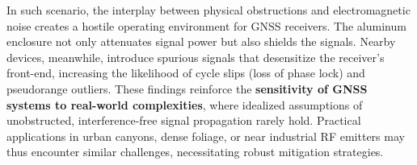         \noindent
        In such scenario, the interplay between physical obstructions and electromagnetic noise creates a hostile operating environment for GNSS receivers. The aluminum enclosure not only attenuates signal power but also shields the signals. Nearby devices, meanwhile, introduce spurious signals that desensitize the receiver's front-end, increasing the likelihood of cycle slips (loss of phase lock) and pseudorange outliers. These findings reinforce the \textbf{sensitivity of GNSS systems to real-world complexities}, where idealized assumptions of unobstructed, interference-free signal propagation rarely hold. Practical applications in urban canyons, dense foliage, or near industrial RF emitters may thus encounter similar challenges, necessitating robust mitigation strategies.
        
